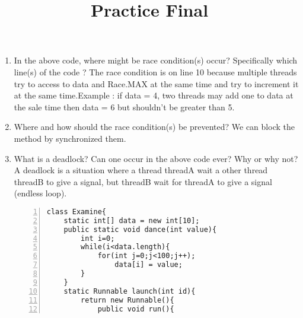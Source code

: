 \documentclass{article}
\author{}
\date{}
\title{Practice Final}
\begin{document}
\maketitle
\begin{enumerate}
\begin{lstlisting}[numbers=left]
class Race{
	public static final int MAX = 5;
 	public static final int MIN = 1;

 	private static int data=Race.MIN;
	public static int getData(){
		return data;
	}
	public static void incData() {
		if (data < Race.MAX)
			data++;
	}
	public static void foo() throws Exception{
		while (data < Race.MAX)
			incData();
	}
}

public class Car implements Runnable { 
	public void run(){
		Race.foo();
	}
	public static void main(String[] args) throws Exception{
  		Thread t1 = new Thread(new Car());
  		Thread t2 = new Thread(new Car());
  		t1.start();
  		t2.start();
  		t1.join();
  		t2.join();
  		System.out.println(Race.getData());
 	}
}
\end{lstlisting}
	\item In the above code, where might be race condition(s) occur? Specifically which line(s) of the code ?\newline
	The race condition is on line 10 because multiple threads try to access to data and Race.MAX at the same time and try to increment it at the same time.\newline Example : if data = 4, two threads may add one to data at the sale time then data = 6 but shouldn't be greater than 5.
	\item Where and how should the race condition(s) be prevented?\newline
	We can block the method by synchronized them.
	\item What is a deadlock? Can one occur in the above code ever? Why or why not?\newline
	A deadlock is a situation where a thread threadA wait a other thread threadB to give a signal, but threadB wait for threadA to give a signal (endless loop).
\newpage
\begin{lstlisting}[numbers=left]
class Examine{
 	static int[] data = new int[10];
 	public static void dance(int value){
  		int i=0;
  		while(i<data.length){
   			for(int j=0;j<100;j++);
   				data[i] = value;
  		}
 	}
 	static Runnable launch(int id){
  		return new Runnable(){
   			public void run(){

\end{lstlisting}
\end{enumerate}
\end{document}
